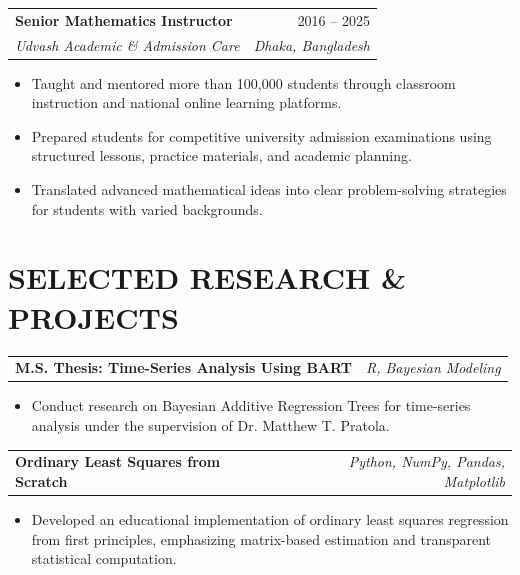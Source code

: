 \documentclass[10pt,letterpaper]{article}
\makeatletter
\newcommand{\resumeEntry}[4]{%
	\begin{tabularx}{\textwidth}{@{}Xr@{}}
		\textbf{#1} & #2 \\
		\textit{#3} & \textit{#4}
	\end{tabularx}%
}
\newcommand{\projectEntry}[2]{%
	\begin{tabularx}{\textwidth}{@{}Xr@{}}
		\textbf{#1} & \textit{#2}
	\end{tabularx}%
}
\newenvironment{resumeItems}{%
	\begin{itemize}[
		label=\textbullet,
		leftmargin=14pt,
		labelsep=5pt,
		itemsep=0.5pt,
		topsep=1.0pt,
		parsep=0pt,
		partopsep=0pt
	]
}{%
	\end{itemize}
}
\makeatother
\begin{document}
\vspace{1.3pt}

\resumeEntry
	{Senior Mathematics Instructor}
	{2016 -- 2025}
	{Udvash Academic \& Admission Care}
	{Dhaka, Bangladesh}

\begin{resumeItems}
	\item Taught and mentored more than 100,000 students through classroom instruction and national online learning platforms.

	\item Prepared students for competitive university admission examinations using structured lessons, practice materials, and academic planning.

	\item Translated advanced mathematical ideas into clear problem-solving strategies for students with varied backgrounds.
\end{resumeItems}

\section*{SELECTED RESEARCH \& PROJECTS}

\projectEntry
	{M.S. Thesis: Time-Series Analysis Using BART}
	{R, Bayesian Modeling}

\begin{resumeItems}
	\item Conduct research on Bayesian Additive Regression Trees for time-series analysis under the supervision of Dr. Matthew T. Pratola.
\end{resumeItems}

\vspace{0.7pt}

\projectEntry
	{Ordinary Least Squares from Scratch}
	{Python, NumPy, Pandas, Matplotlib}

\begin{resumeItems}
	\item Developed an educational implementation of ordinary least squares regression from first principles, emphasizing matrix-based estimation and transparent statistical computation.
\end{resumeItems}

\end{document}
